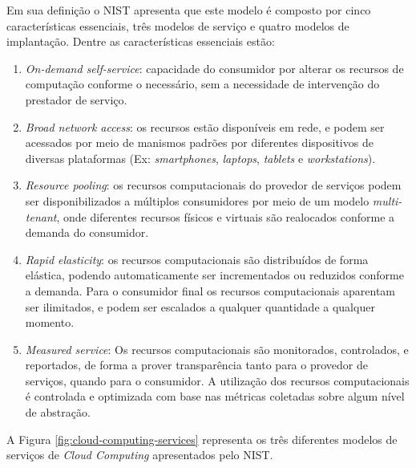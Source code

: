 Em sua definição o NIST apresenta que este modelo é composto
por cinco características essenciais, três modelos de serviço e
quatro modelos de implantação. Dentre as características essenciais
estão:
\begin{enumerate}
    \item \emph{On-demand self-service}: capacidade do consumidor
          por alterar os recursos de computação conforme o necessário,
          sem a necessidade de intervenção do prestador de serviço.

    \item \emph{Broad network access}: os recursos estão disponíveis
          em rede, e podem ser acessados por meio de manismos padrões por
          diferentes dispositivos de diversas plataformas (Ex: \emph{smartphones},
          \emph{laptops}, \emph{tablets} e \emph{workstations}).

    \item \emph{Resource pooling}: os recursos computacionais do provedor
          de serviços podem ser disponibilizados a múltiplos consumidores
          por meio de um modelo \emph{multi-tenant}, onde diferentes recursos
          físicos e virtuais são realocados conforme a demanda do consumidor.

    \item \emph{Rapid elasticity}: os recursos computacionais são distribuídos
          de forma elástica, podendo automaticamente ser incrementados ou reduzidos
          conforme a demanda. Para o consumidor final os recursos computacionais
          aparentam ser ilimitados, e podem ser escalados a qualquer quantidade
          a qualquer momento.

    \item \emph{Measured service}: Os recursos computacionais são monitorados,
          controlados, e reportados, de forma a prover transparência tanto para o provedor
          de serviços, quando para o consumidor. A utilização dos recursos computacionais
          é controlada e optimizada com base nas métricas coletadas sobre algum nível de abstração.
\end{enumerate}


A Figura \ref{fig:cloud-computing-services} representa os três
diferentes modelos de serviços de \emph{Cloud Computing} apresentados pelo NIST.

